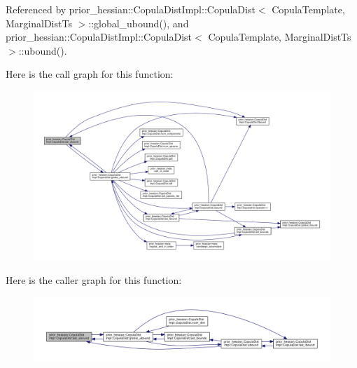 Referenced by prior\+\_\+hessian\+::\+Copula\+Dist\+Impl\+::\+Copula\+Dist$<$ Copula\+Template, Marginal\+Dist\+Ts $>$\+::global\+\_\+ubound(), and prior\+\_\+hessian\+::\+Copula\+Dist\+Impl\+::\+Copula\+Dist$<$ Copula\+Template, Marginal\+Dist\+Ts $>$\+::ubound().



Here is the call graph for this function\+:\nopagebreak
\begin{figure}[H]
\begin{center}
\leavevmode
\includegraphics[width=350pt]{classprior__hessian_1_1CopulaDistImpl_1_1CopulaDist_a4b010ffe2c2acd4dc75c80b32312254d_cgraph}
\end{center}
\end{figure}




Here is the caller graph for this function\+:\nopagebreak
\begin{figure}[H]
\begin{center}
\leavevmode
\includegraphics[width=350pt]{classprior__hessian_1_1CopulaDistImpl_1_1CopulaDist_a4b010ffe2c2acd4dc75c80b32312254d_icgraph}
\end{center}
\end{figure}


